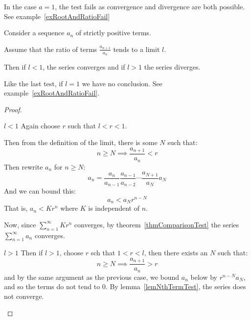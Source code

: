 \documentclass[../Main.tex]{subfiles}
\begin{document}
\begin{remark}
    In the case $a = 1$, the test fails as convergence and divergence are both possible. See example~\ref{exRootAndRatioFail}
\end{remark}
\begin{theorem}
    Consider a sequence $a_n$ of strictly positive terms.\par
    Assume that the ratio of terms $\frac{a_{n+1}}{a_n}$ tends to a limit $l$.\par
    Then if $l < 1$, the series converges and if $l > 1$ the series diverges.
    \label{thmRatioTest}
\end{theorem}
\begin{remark}
    Like the last test, if $l = 1$ we have no conclusion. See example~\ref{exRootAndRatioFail}.
\end{remark}
\begin{proof}
    \begin{case}{$l < 1$}
        Again choose $r$ such that $l < r < 1$.\par
        Then from the definition of the limit, there is some $N$ such that:
        \begin{equation*}
            n \geq N \implies \frac{a_{n+1}}{a_n} < r
        \end{equation*}
        Then rewrite $a_n$ for $n \geq N$:
        \begin{equation*}
            a_n = \frac{a_n}{a_{n-1}} \frac{a_{n-1}}{a_{n-2}} \cdots \frac{a_{N+1}}{a_N} a_N
        \end{equation*}
        And we can bound this:
        \begin{equation*}
            a_n < a_N r^{n - N}
        \end{equation*}
        That is, $a_n < Kr^n$ where $K$ is independent of $n$.\par
        Now, since $\sum_{n = 1}^\infty Kr^n$ converges, by theorem~\ref{thmComparisonTest} the series $\sum_{n=1}^\infty a_n$ converges.
    \end{case}
    \begin{case}{$l > 1$}
        Then if $l > 1$, choose $r$ sch that $1 < r < l$, then there exists an $N$ such that:
        \begin{equation*}
            n \geq N \implies \frac{a_{n+1}}{a_n} > r
        \end{equation*}
        and by the same argument as the previous case, we bound $a_n$ below by $r^{n-N}a_N$, and so the terms do not tend to 0. By lemma~\ref{lemNthTermTest}, the series does not converge.
    \end{case}
\end{proof}
\end{document}
